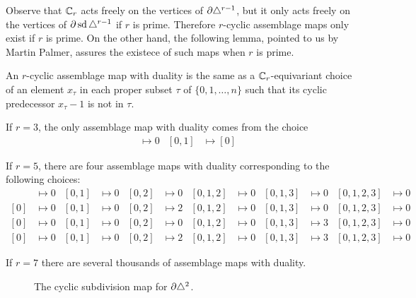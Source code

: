 Observe that $\mathbb{C}_r$ acts freely on the vertices of $\partial \triangle^{r-1}$, but it only acts freely on the vertices of $\partial \operatorname{sd}\triangle^{r-1}$ if $r$ is prime. Therefore $r$-cyclic assemblage maps only exist if $r$ is prime. On the other hand, the following lemma, pointed to us by Martin Palmer, assures the existece of such maps when $r$ is prime.
\begin{lemma} An $r$-cyclic assemblage map with duality is the same as a  $\mathbb{C}_r$-equivariant choice of an element $x_\tau$ in each proper subset $\tau$ of $\{0,1,\ldots,n\}$ such that its cyclic predecessor $x_\tau-1$ is not in $\tau$.
\end{lemma}
\begin{example}
    If $r=3$, the only assemblage map with duality comes from the choice
    \begin{align*}
        [0]&\mapsto 0 & [0,1]&\mapsto [0]
    \end{align*}
\end{example}
\begin{example}
    If $r=5$, there are four assemblage maps with duality corresponding to the following choices:
    \begin{align*}
        [0]&\mapsto 0 & [0,1]&\mapsto 0 & [0,2]&\mapsto 0 & [0,1,2]&\mapsto 0 & [0,1,3] & \mapsto 0 & [0,1,2,3] & \mapsto 0 \\
        [0]&\mapsto 0 & [0,1]&\mapsto 0 & [0,2]&\mapsto 2 & [0,1,2]&\mapsto 0 & [0,1,3] & \mapsto 0 & [0,1,2,3] & \mapsto 0 \\
        [0]&\mapsto 0 & [0,1]&\mapsto 0 & [0,2]&\mapsto 0 & [0,1,2]&\mapsto 0 & [0,1,3] & \mapsto 3 & [0,1,2,3] & \mapsto 0 \\
        [0]&\mapsto 0 & [0,1]&\mapsto 0 & [0,2]&\mapsto 2 & [0,1,2]&\mapsto 0 & [0,1,3] & \mapsto 3 & [0,1,2,3] & \mapsto 0
    \end{align*}
\end{example}
If $r=7$ there are several thousands of assemblage maps with duality. 
\begin{figure}
\caption{The cyclic subdivision map for $\partial \triangle^2$.}
\end{figure}

